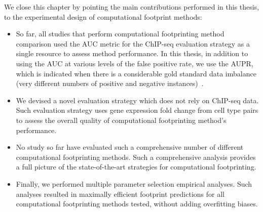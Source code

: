 We close this chapter by pointing the main contributions performed in this thesis, to the experimental design of computational footprint methods:
\begin{itemize}
\item So far, all studies that perform computational footprinting method comparison used the AUC metric for the ChIP-seq evaluation strategy as a single resource to assess method performance. In this thesis, in addition to using the AUC at various levels of the false positive rate, we use the AUPR, which is indicated when there is a considerable gold standard data imbalance (very different numbers of positive and negative instances)~\cite{davis2006,fawcett2006}.
\item We devised a novel evaluation strategy which does not rely on ChIP-seq data. Such evaluation strategy uses gene expression fold change from cell type pairs to assess the overall quality of computational footprinting method's performance.
\item No study so far have evaluated such a comprehensive number of different computational footprinting methods. Such a comprehensive analysis provides a full picture of the state-of-the-art strategies for computational footprinting.
\item Finally, we performed multiple parameter selection empirical analyses. Such analyses resulted in maximally efficient footprint predictions for all computational footprinting methods tested, without adding overfitting biases.
\end{itemize}


